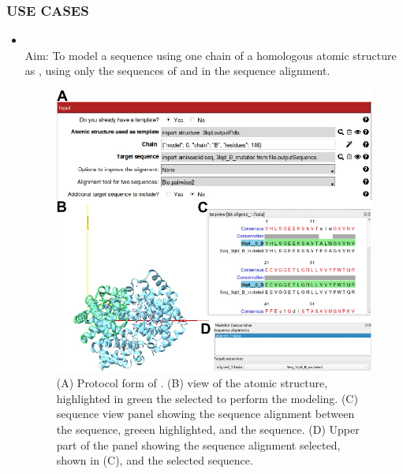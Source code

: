 \subsubsection*{USE CASES}
\begin{itemize}
                \item {}\\
                Aim: To model a  sequence using one chain of a homologous atomic structure as , using only the sequences of  and  in the sequence alignment.

                            \begin{figure}[H]
                            \centering 
                            \captionsetup{width=.9\linewidth} 
                            \includegraphics[width=.9\textwidth]{Images_appendix/Fig305.pdf}
                            \caption{(A) Protocol form of . (B) \chimera view of the  atomic structure, highlighted in green the  selected to perform the modeling. (C) \chimera sequence view panel showing the sequence alignment between the   sequence, greeen highlighted, and the  sequence. (D) Upper part of the \chimera {} panel showing the sequence alignment selected, shown in (C), and the selected  sequence.}  
                            \label{fig:app_protocol_seqHomology_2}

\end{figure}
\end{itemize}
